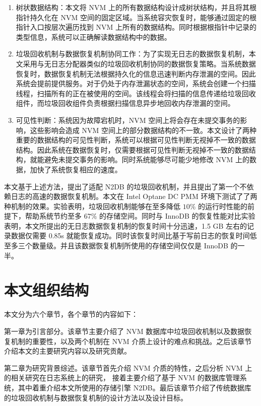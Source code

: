 \begin{enumerate}
    \item 树状数据结构：本文将 NVM 上的所有数据结构设计成树状结构，并且将其根指针持久化在 NVM 空间的固定区域。当系统容灾恢复时，能够通过固定的根指针入口按层次遍历找到 NVM 上所有的数据结构。同时根据根指针中记录的类型信息，系统可以正确解读数据结构中的数据。
    \item 垃圾回收机制与数据恢复机制协同工作：为了实现无日志的数据恢复机制，本文采用与无日志分配器类似的垃圾回收机制协同的数据恢复策略。当系统数据恢复时，数据恢复机制无法根据持久化的信息迅速判断内存泄漏的空间。因此系统会提前提供服务。对于仍处于内存泄漏状态的空间，系统会创建一个扫描线程，扫描所有的正在被使用的空间。该线程会将扫描的信息传递给垃圾回收组件，而垃圾回收组件负责根据扫描信息异步地回收内存泄漏的空间。
    \item 可见性判断：系统因为故障宕机时，NVM 空间上将会存在未提交事务的影响，这些影响会造成 NVM 空间上的部分数据结构的不一致。本文设计了两种重要的数据结构的可见性判断，系统可以根据可见性判断无视掉不一致的数据结构。因此系统在数据恢复时，仅需要根据可见性判断无视掉不一致的数据结构，就能避免未提交事务的影响。同时系统能够尽可能少地修改 NVM 上的数据，加快了系统恢复相应的速度。
\end{enumerate}

本文基于上述方法，提出了适配 N2DB 的垃圾回收机制，并且提出了第一个不依赖日志的高速的数据恢复机制。本文在 Intel Optane DC PMM 环境下测试了了两种机制的效果。实验表明，垃圾回收机制能够在至多降低 $10\%$ 的运行时性能的前提下，帮助系统节约至多 $67\%$ 的存储空间。同时与 InnoDB 的恢复性能对比实验表明，本文所提出的无日志数据恢复机制的恢复时间十分迅速，1.5 GB 左右的记录数据仅需要 0.85s 就能恢复成功。同时该恢复时间比基于写前日志的恢复时间低至多三个数量级。并且该数据恢复机制所使用的存储空间仅仅是 InnoDB 的一半。

\section{本文组织结构}

本文分为六个章节，各个章节的内容如下：

第一章为引言部分。该章节主要介绍了 NVM 数据库中垃圾回收机制以及数据恢复机制的重要性，以及两个机制在 NVM 介质上设计的难点和挑战。之后该章节介绍本文的主要研究内容以及研究贡献。

第二章为研究背景综述。该章节首先介绍 NVM 介质的特性，之后分析 NVM 上的相关研究在日志系统上的研究，
接着主要介绍了基于 NVM 的数据库管理系统，其中着重介绍本文所使用的存储引擎 N2DB。最后该章节介绍了传统数据库的垃圾回收机制与数据恢复机制的设计方法以及设计目标。

